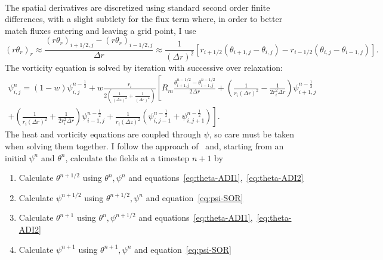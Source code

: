 \documentclass[11pt,twocolumn]{article}
\begin{document}
\begin{appendices}
\begin{eqnarray}
\end{eqnarray}
The spatial derivatives are discretized using standard second order finite differences, with a slight subtlety for the flux term where, in order to better match fluxes entering and leaving a grid point, I use
\begin{equation}
(r \theta_r)_r \approx \frac{(r \theta_r)_{i+1/2, j} - (r \theta_r)_{i-1/2,j}}{ \Delta r} \approx \frac{1}{(\Delta r)^2} \left[ r_{i+1/2} \left( \theta_{i+1, j} - \theta_{i, j} \right) - r_{i-1/2} \left( \theta_{i, j} - \theta_{i-1, j} \right)\right].
\end{equation}
The vorticity equation is solved by iteration with successive over relaxation:
\begin{multline}
\label{eq:psi-SOR}
  \psi^n_{i,j} = (1-w) \psi_{i,j}^{n-\frac{1}{2}} + w \frac{r_i}{2 \left( \frac{1}{(\Delta z)^2} + \frac{1}{(\Delta r)^2}\right)} \left[  R_m  \frac{\theta^{n-1/2}_{i+1, j} - \theta^{n-1/2}_{i-1, j}}{2 \Delta r} + \left(\frac{1}{r_i (\Delta r)^2} - \frac{1}{2 r_i^2 \Delta r} \right) \psi^{n-\frac{1}{2}}_{i+1, j}           \right.   \\ +   \left.             
                 \left(\frac{1}{r_i (\Delta r)^2} + \frac{1}{2 r_i^2 \Delta r} \right) \psi^{n-\frac{1}{2}}_{i-1, j} + \frac{1}{r_i (\Delta z)^2} \left(\psi^{n-\frac{1}{2}}_{i,j-1} + \psi^{n-\frac{1}{2}}_{i, j+1} \right)                         \right]  .
\end{multline}
The heat and vorticity equations are coupled through $\psi$, so care must be taken when solving them together. I follow the approach of~\citet*{hewitt-14} and, starting from an initial $\psi^n$ and $\theta^n$, calculate the fields at a timestep $n+1$ by
\begin{enumerate}
	\item Calculate $\theta^{n+1/2}$ using $\theta^n, \psi^n$ and equations~\eqref{eq:theta-ADI1},~\eqref{eq:theta-ADI2}
	\item Calculate $\psi^{n+1/2}$ using $\theta^{n+1/2}, \psi^n$ and equation~\eqref{eq:psi-SOR}
	\item Calculate $\theta^{n+1}$ using $\theta^n, \psi^{n+1/2}$ and equations~\eqref{eq:theta-ADI1},~\eqref{eq:theta-ADI2}
	\item Calculate $\psi^{n+1}$ using $\theta^{n+1}, \psi^n$ and equation~\eqref{eq:psi-SOR}
\end{enumerate}




\end{appendices}
\end{document}
